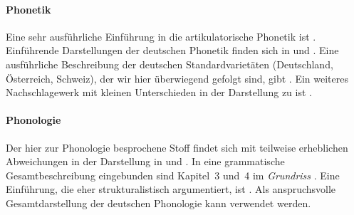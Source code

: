 \WeitereLiteratur

\paragraph*{Phonetik}

Eine sehr ausführliche Einführung in die artikulatorische Phonetik ist \citet{Laver94}.
Einführende Darstellungen der deutschen Phonetik finden sich \zB in \citet{RRKWS09} und \citet{Wiese10}.
Eine ausführliche Beschreibung der deutschen Standardvarietäten (Deutschland, Österreich, Schweiz), der wir hier überwiegend gefolgt sind, gibt \citet{Krech-ea2009}.
Ein weiteres Nachschlagewerk mit kleinen Unterschieden in der Darstellung zu \citealp{Krech-ea2009} ist \citet{Mangold06}.

\paragraph*{Phonologie}

\label{abs:pholliteratur}

Der hier zur Phonologie besprochene Stoff findet sich mit teilweise erheblichen Abweichungen in der Darstellung \zB in \citet{Hall00} und \citet{Wiese10}.
In eine grammatische Gesamtbeschreibung eingebunden sind Kapitel~3 und~4 im \textit{Grundriss} \citep{Eisenberg1}.
Eine Einführung, die eher strukturalistisch argumentiert, ist \citet{Ternes2012}.
Als anspruchsvolle Gesamtdarstellung der deutschen Phonologie kann \citet{Wiese00} verwendet werden.
